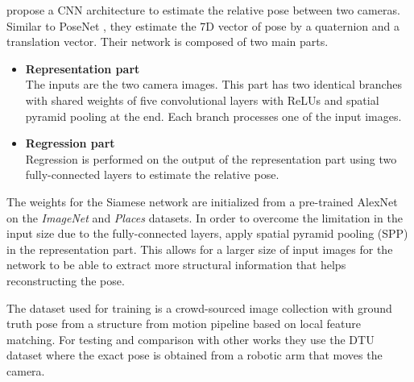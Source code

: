 		\cite{melekhov2017poseCNN} propose a CNN architecture to estimate the relative pose between two cameras.
		Similar to PoseNet \cite{kendall2015posenet}, they estimate the 7D vector of pose by a quaternion and a translation vector.
		Their network is composed of two main parts.
		\begin{itemize}
			\item \textbf{Representation part}
				\\
				The inputs are the two camera images. 
				This part has two identical branches with shared weights of five convolutional layers with ReLUs and spatial pyramid pooling at the end.
				Each branch processes one of the input images.
			\item \textbf{Regression part}
				\\
				Regression is performed on the output of the representation part using two fully-connected layers to estimate the relative pose.
		\end{itemize}
		The weights for the Siamese network are initialized from a pre-trained AlexNet on the \emph{ImageNet} and \emph{Places} datasets.
		In order to overcome the limitation in the input size due to the fully-connected layers, \cite{melekhov2017poseCNN} apply spatial pyramid pooling (SPP) in the representation part.
		This allows for a larger size of input images for the network to be able to extract more structural information that helps reconstructing the pose.
		
		The dataset used for training is a crowd-sourced image collection with ground truth pose from a structure from motion pipeline based on local feature matching.
		For testing and comparison with other works they use the {DTU} dataset where the exact pose is obtained from a robotic arm that moves the camera.
		
